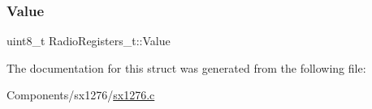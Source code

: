 \mbox{\label{structRadioRegisters__t_a0a8957bb6a4a895509181c120af90cdf}} 
\subsubsection{\texorpdfstring{Value}{Value}}
{\footnotesize\ttfamily uint8\+\_\+t Radio\+Registers\+\_\+t\+::\+Value}



The documentation for this struct was generated from the following file\+:\begin{DoxyCompactItemize}
\item 
Components/sx1276/\hyperlink{sx1276_8c}{sx1276.\+c}\end{DoxyCompactItemize}
